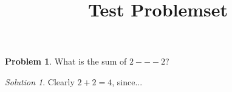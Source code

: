 \documentclass{article}
\theoremstyle{definition}
\newtheorem{problem}{Problem}
\theoremstyle{remark}
\newtheorem*{solution}{Solution}
\begin{document}
\title{Test Problemset}

\begin{problem}
What is the sum of $2---2$?
\end{problem}
\begin{solution}
Clearly $2+2=4$, since...
\end{solution}
\end{document}
